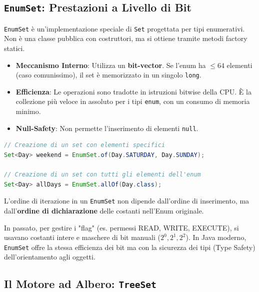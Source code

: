 \subsection{\texttt{EnumSet}: Prestazioni a Livello di Bit}

\texttt{EnumSet} è un'implementazione speciale di \texttt{Set} progettata per tipi enumerativi. Non è una classe pubblica con costruttori, ma si ottiene tramite metodi factory statici.

\begin{itemize}
    \item \textbf{Meccanismo Interno}: Utilizza un \textbf{bit-vector}. Se l'enum ha $\le 64$ elementi (caso comunissimo), il set è memorizzato in un singolo \texttt{long}.
    \item \textbf{Efficienza}: Le operazioni sono tradotte in istruzioni bitwise della CPU. È la collezione più veloce in assoluto per i tipi \texttt{enum}, con un consumo di memoria minimo.
    \item \textbf{Null-Safety}: Non permette l'inserimento di elementi \texttt{null}.
\end{itemize}

\begin{lstlisting}[language=Java, caption={Esempio di EnumSet}]
// Creazione di un set con elementi specifici
Set<Day> weekend = EnumSet.of(Day.SATURDAY, Day.SUNDAY);

// Creazione di un set con tutti gli elementi dell'enum
Set<Day> allDays = EnumSet.allOf(Day.class);
\end{lstlisting}

\begin{observation}
L'ordine di iterazione in un \texttt{EnumSet} non dipende dall'ordine di inserimento, ma dall'\textbf{ordine di dichiarazione} delle costanti nell'Enum originale.
\end{observation}

\begin{bestpractice}
In passato, per gestire i "flag" (es. permessi READ, WRITE, EXECUTE), si usavano costanti intere e maschere di bit manuali ($2^0, 2^1, 2^2$). In Java moderno, \texttt{EnumSet} offre la stessa efficienza dei bit ma con la sicurezza dei tipi (Type Safety) dell'orientamento agli oggetti.
\end{bestpractice}


\subsection{Il Motore ad Albero: \texttt{TreeSet}}


